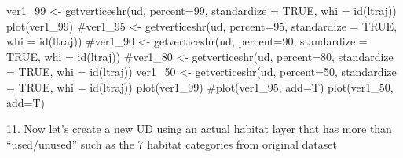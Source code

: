 \documentclass[
  letterpaper,
]{book}
\newenvironment{Shaded}{\begin{snugshade}}{\end{snugshade}}
\newcommand{\AttributeTok}[1]{\textcolor[rgb]{0.40,0.45,0.13}{#1}}
\newcommand{\CommentTok}[1]{\textcolor[rgb]{0.37,0.37,0.37}{#1}}
\newcommand{\ConstantTok}[1]{\textcolor[rgb]{0.56,0.35,0.01}{#1}}
\newcommand{\DecValTok}[1]{\textcolor[rgb]{0.68,0.00,0.00}{#1}}
\newcommand{\FunctionTok}[1]{\textcolor[rgb]{0.28,0.35,0.67}{#1}}
\newcommand{\NormalTok}[1]{\textcolor[rgb]{0.00,0.23,0.31}{#1}}
\newcommand{\OtherTok}[1]{\textcolor[rgb]{0.00,0.23,0.31}{#1}}
\begin{document}
\begin{Shaded}
\begin{Highlighting}[]
\NormalTok{ver1\_99 }\OtherTok{\textless{}{-}} \FunctionTok{getverticeshr}\NormalTok{(ud, }\AttributeTok{percent=}\DecValTok{99}\NormalTok{, }\AttributeTok{standardize =} \ConstantTok{TRUE}\NormalTok{, }\AttributeTok{whi =} \FunctionTok{id}\NormalTok{(ltraj))}
\FunctionTok{plot}\NormalTok{(ver1\_99)}
\CommentTok{\#ver1\_95 \textless{}{-} getverticeshr(ud, percent=95, standardize = TRUE, whi = id(ltraj))}
\CommentTok{\#ver1\_90 \textless{}{-} getverticeshr(ud, percent=90, standardize = TRUE, whi = id(ltraj))}
\CommentTok{\#ver1\_80 \textless{}{-} getverticeshr(ud, percent=80, standardize = TRUE, whi = id(ltraj))}
\NormalTok{ver1\_50 }\OtherTok{\textless{}{-}} \FunctionTok{getverticeshr}\NormalTok{(ud, }\AttributeTok{percent=}\DecValTok{50}\NormalTok{, }\AttributeTok{standardize =} \ConstantTok{TRUE}\NormalTok{, }\AttributeTok{whi =} \FunctionTok{id}\NormalTok{(ltraj))}
\FunctionTok{plot}\NormalTok{(ver1\_99)}
\CommentTok{\#plot(ver1\_95, add=T)}
\FunctionTok{plot}\NormalTok{(ver1\_50, }\AttributeTok{add=}\NormalTok{T)}
\end{Highlighting}
\end{Shaded}

11. Now let's create a new UD using an actual habitat layer that has
more than ``used/unused'' such as the 7 habitat categories from original
dataset
\end{document}
